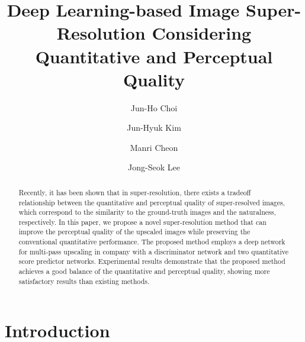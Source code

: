 \documentclass[runningheads]{llncs}
\begin{document}
%
\title{Deep Learning-based Image Super-Resolution Considering Quantitative and Perceptual Quality} 

%
\author{Jun-Ho Choi \and Jun-Hyuk Kim \and Manri Cheon \and Jong-Seok Lee}
%
%

%
\maketitle              %
%
\begin{abstract}
Recently, it has been shown that in super-resolution, there exists a tradeoff relationship between the quantitative and perceptual quality of super-resolved images, which correspond to the similarity to the ground-truth images and the naturalness, respectively.
In this paper, we propose a novel super-resolution method that can improve the perceptual quality of the upscaled images while preserving the conventional quantitative performance.
The proposed method employs a deep network for multi-pass upscaling in company with a discriminator network and two quantitative score predictor networks.
Experimental results demonstrate that the proposed method achieves a good balance of the quantitative and perceptual quality, showing more satisfactory results than existing methods.

\end{abstract}
%
%
%
\section{Introduction}
\end{document}
